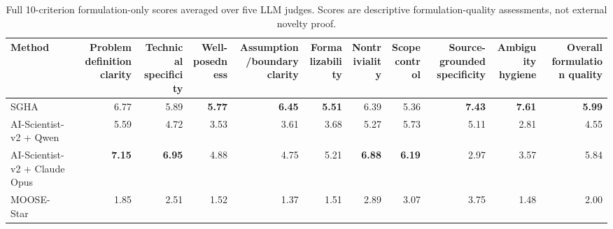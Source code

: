 \begin{table}[t]
\centering
\small
\caption{Full 10-criterion formulation-only scores averaged over five LLM judges. Scores are descriptive formulation-quality assessments, not external novelty proof.}
\label{tab:appendix_full_formulation_quality_with_moose}
\begin{tabular}{lrrrrrrrrrr}
\toprule
Method & Problem definition clarity & Technical specificity & Well-posedness & Assumption/boundary clarity & Formalizability & Nontriviality & Scope control & Source-grounded specificity & Ambiguity hygiene & Overall formulation quality \\
\midrule
SGHA & 6.77 & 5.89 & \textbf{5.77} & \textbf{6.45} & \textbf{5.51} & 6.39 & 5.36 & \textbf{7.43} & \textbf{7.61} & \textbf{5.99} \\
AI-Scientist-v2 + Qwen & 5.59 & 4.72 & 3.53 & 3.61 & 3.68 & 5.27 & 5.73 & 5.11 & 2.81 & 4.55 \\
AI-Scientist-v2 + Claude Opus & \textbf{7.15} & \textbf{6.95} & 4.88 & 4.75 & 5.21 & \textbf{6.88} & \textbf{6.19} & 2.97 & 3.57 & 5.84 \\
MOOSE-Star & 1.85 & 2.51 & 1.52 & 1.37 & 1.51 & 2.89 & 3.07 & 3.75 & 1.48 & 2.00 \\
\bottomrule
\end{tabular}
\end{table}

